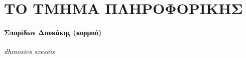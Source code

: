 \hypertarget{ux3c4ux3bf-ux3c4ux3bcux3b7ux3bcux3b1-ux3c0ux3bbux3b7ux3c1ux3bfux3c6ux3bfux3c1ux3b9ux3baux3b7ux3c3}{%
\chapter{ΤΟ ΤΜΗΜΑ
ΠΛΗΡΟΦΟΡΙΚΗΣ}\label{ux3c4ux3bf-ux3c4ux3bcux3b7ux3bcux3b1-ux3c0ux3bbux3b7ux3c1ux3bfux3c6ux3bfux3c1ux3b9ux3baux3b7ux3c3}}

\hypertarget{ux3c3ux3c0ux3c5ux3c1ux3afux3b4ux3c9ux3bd-ux3b4ux3bfux3c5ux3baux3acux3baux3b7ux3c2-ux3baux3bfux3c1ux3bcux3bfux3cd}{%
\subsubsection{Σπυρίδων Δουκάκης
(κορμού)}\label{ux3c3ux3c0ux3c5ux3c1ux3afux3b4ux3c9ux3bd-ux3b4ux3bfux3c5ux3baux3acux3baux3b7ux3c2-ux3baux3bfux3c1ux3bcux3bfux3cd}}

\emph{dhmosies sxeseis}
